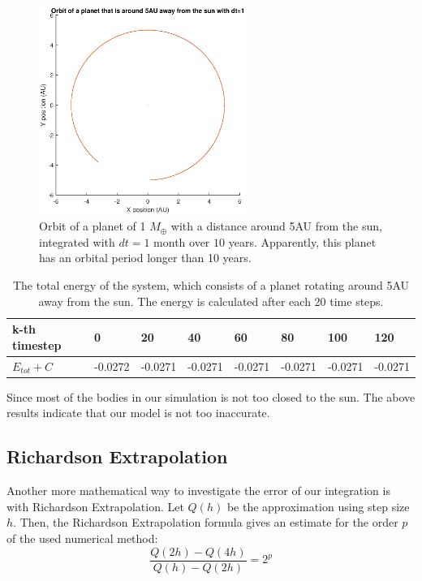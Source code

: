 \begin{figure}[H]
\centering
\includegraphics[width=0.6\textwidth]{Planeet_5AU_dt1_10jaar.eps}
\caption{Orbit of a planet of 1 $M_{\oplus}$ with a distance around 5AU from the sun, integrated with $dt=1$ month over $10$ years. Apparently, this planet has an orbital period longer than 10 years.}
    \label{fig:Planet5AUdt1}
\end{figure}

\begin{table}[htb]
\centering
\caption{The total energy of the system, which consists of a planet rotating around 5AU away from the sun. The energy is calculated after each 20 time steps.}
\begin{tabular}{|l|l|l|l|l|l|l|l|}
\hline
k-th timestep&0&20&40&60&80&100&120\\ \hline
$E_{tot}+C$&-0.0272&   -0.0271&   -0.0271&   -0.0271&   -0.0271&   -0.0271&   -0.0271\\ \hline
\end{tabular}
\label{tab:Planet5AUEnergy}
\end{table}

Since most of the bodies in our simulation is not too closed to the sun. 
The above results indicate that our model is not too inaccurate.

\subsection{Richardson Extrapolation}
Another more mathematical way to investigate the error of our integration is with Richardson Extrapolation. 
Let $Q(h)$ be the approximation using step size $h$. 
Then, the Richardson Extrapolation formula \cite{Richardson} gives an estimate for the order $p$ of the used numerical method:
\[\frac{Q(2h)-Q(4h)}{Q(h)-Q(2h)}=2^p\]

